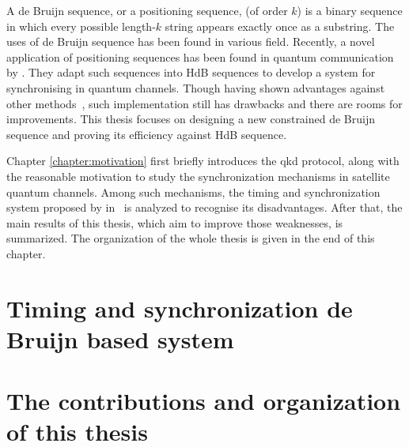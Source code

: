 A de Bruijn sequence, or a positioning sequence, (of order $k$) is a binary sequence in which every possible length-$k$ string appears exactly once as a substring. The uses of de Bruijn sequence has been found in various field. Recently, a novel application of positioning sequences has been found in quantum communication by \citeauthor{zhang2021timing}. They adapt such sequences into \gls{HdB} sequences to develop a system for synchronising in quantum channels. Though having shown advantages against other methods~\cite{zhang2021timing}, such implementation still has drawbacks and there are rooms for improvements. This thesis focuses on designing a new constrained de Bruijn sequence and proving its efficiency against \gls{HdB} sequence. 

Chapter \ref{chapter:motivation} first briefly introduces the \gls{qkd} protocol, along with the reasonable motivation to study the synchronization mechanisms in satellite quantum channels. {\color{red}Among such mechanisms, the timing and synchronization system proposed by \citeauthor{zhang2021timing} in~\cite{zhang2021timing} is analyzed to recognise its disadvantages}. After that, the main results of this thesis, which aim to improve those weaknesses, is summarized. The organization of the whole thesis is given in the end of this chapter. 


\section{Timing and synchronization de Bruijn based system}


\section{The contributions and organization of this thesis}




